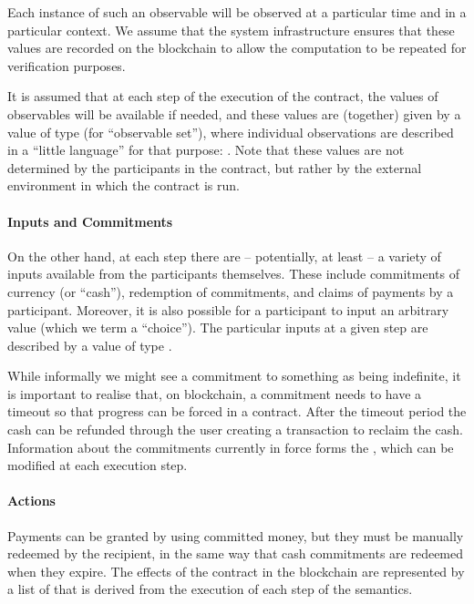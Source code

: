 \documentclass[runningheads]{llncs}
\begin{document}
Each instance of such an observable will be observed at a particular time and in a particular context. We assume that 
the system infrastructure ensures that these values are recorded on the blockchain to allow the computation to be 
repeated for verification purposes. 


It is assumed that at each step of the execution of the contract, the values of observables will be available if 
needed, and these values are (together) given by a value of type  (for ``observable set''), where 
individual observations are described in a ``little language'' for that purpose: . 
Note that these values are not determined by the participants in the contract, but rather by the external environment in 
which the contract is run.

 

\paragraph{Inputs and Commitments}


On the other hand, at each step there are -- potentially, at least -- a variety of inputs available from the 
participants themselves. These include commitments of currency (or ``cash''), redemption of commitments, and claims of 
payments by a participant. Moreover, it is also possible for a participant to input an arbitrary value (which we term a 
``choice''). The particular inputs at a given step are described by a value of type .



While informally we might see a commitment to something as being indefinite, it is important to realise that, 
on blockchain, a commitment needs to have a timeout so that progress can be forced in a contract. After the timeout 
period the cash can be refunded through the user creating a transaction to reclaim the cash. Information about the 
commitments currently in force forms the , which can be  modified at each execution step. 

\paragraph{Actions}

Payments can be granted by using committed money, but they must be manually redeemed by the recipient, in the 
same way that cash commitments are redeemed when they expire. The effects of the contract in the blockchain are 
represented by a list  of  that is derived from the execution of each step of 
the semantics.
\end{document}
